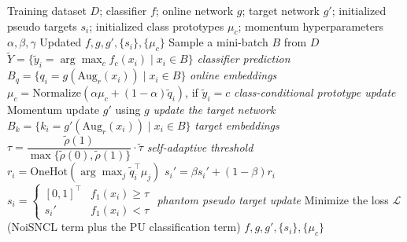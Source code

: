 \documentclass{article}
\begin{document}
\begin{algorithm}[!h]
\renewcommand{\algorithmicrequire}{\textbf{Input:}} %
\renewcommand{\algorithmicensure}{\textbf{Output:}} %
	\caption{NcPU: NoiSNCL + phantom label disambiguation (one epoch)} %
	\begin{algorithmic}[1] %
	    \REQUIRE
	    Training dataset $D$; classifier $f$; online network $g$; target network $g'$;
	    initialized pseudo targets $s_{i}$; initialized class prototypes $\mu_{c}$;
	    momentum hyperparameters $\alpha,\beta,\gamma$
	    \ENSURE
	    Updated $f,g,g',\{s_{i}\},\{\mu_{c}\}$
	    \STATE Sample a mini-batch $B$ from $D$
	    \STATE $\tilde{Y}=\{\tilde{y}_{i}=\arg\max_{c}f_{c}(x_{i})\mid x_{i}\in B\}$
	    \hfill \emph{classifier prediction}
	    \STATE $B_{q}=\{q_{i}=g(\mathrm{Aug}_{r}(x_{i}))\mid x_{i}\in B\}$
	    \hfill \emph{online embeddings}
	    \STATE $\mu_{c}=\mathrm{Normalize}\!\left(\alpha\mu_{c}+(1-\alpha)\tilde{q}_{i}\right)$, if $\tilde{y}_{i}=c$
	    \hfill \emph{class-conditional prototype update} %
	    \ENDFOR
	    \STATE Momentum update $g'$ using $g$
	    \hfill \emph{update the target network} %
	    \STATE $B_{k}=\{k_{i}=g'(\mathrm{Aug}_{r}(x_{i}))\mid x_{i}\in B\}$
	    \hfill \emph{target embeddings}
	    \STATE $\tau=\dfrac{\tilde{\rho}(1)}{\max\{\tilde{\rho}(0),\tilde{\rho}(1)\}}\cdot\tilde{\tau}$
	    \hfill \emph{self-adaptive threshold} %
	    \STATE $r_{i}=\mathrm{OneHot}\!\left(\arg\max_{j}\tilde{q}_{i}^{\top}\mu_{j}\right)$ %
	    \STATE $s_{i}'=\beta s_{i}'+(1-\beta)r_{i}$
	    \STATE $s_{i}=\begin{cases}[0,1]^{\top} & f_{1}(x_{i})\geq\tau\\ s_{i}' & f_{1}(x_{i})<\tau\end{cases}$
	    \hfill \emph{phantom pseudo target update} %
	    \ENDFOR
	    \STATE Minimize the loss $\mathcal{L}$ (NoiSNCL term plus the PU classification term)
	    \ENDFOR
		\RETURN $f,g,g',\{s_{i}\},\{\mu_{c}\}$
	\end{algorithmic}
\end{algorithm}
\end{document}
